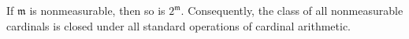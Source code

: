 If $\mathfrak{m}$ is nonmeasurable, then so is $2^{\mathfrak{m}}$. Consequently, the class of all nonmeasurable cardinals is closed under all standard operations of cardinal arithmetic.